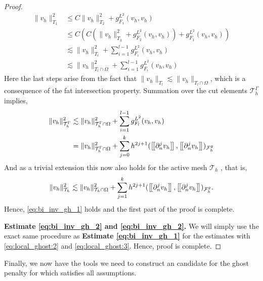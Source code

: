 \begin{proof}
    \begin{align}
            \| v_{h} \|_{ T_{1} }^{2  }  & \le  C \| v_{h} \|_{ T_{2} }^{ 2 } + g_{F_{1}}^{L^{2}}( v_{h},v_{h})\\
              & \le  C( C( \| v_{h} \|_{ T_{3} }^{ 2 } + g_{F_{2}}^{L^{2}}( v_{h},v_{h}) ) + g_{F_{1}}^{L^{2}}( v_{h},v_{h}) )\\
              & \lesssim    \| v_{h} \|_{ T_{l} }^{ 2 }  + \sum_{i=1}^{l-1} g_{F_{i}}^{L^{2}}( v_{h},v_{h})  \\
              & \lesssim    \| v_{h} \|_{ T_{l} \cap \Omega  }^{ 2 }  + \sum_{i=1}^{l-1} g_{F_{i}}^{L^{2}}( v_{h},v_{h})
    \end{align}
            Here the last steps arise from the fact that $\|  v_{h} \|_{ T_{l} }^{  } \lesssim  \|  v_{h} \|_{ T_{l} \cap \Omega  }^{  }  $, which is a consequence of the fat intersection property.
            Summation over the cut elements $\mathcal{T} ^{\Gamma }_{h}$ implies,
            \begin{align}
                    \| v_{h} \|_{ \mathcal{T} ^{\Gamma }_h }^{2  } & \lesssim \| v_{h} \|_{ \mathcal{T} ^{\Gamma }_h\cap \Omega  }^{2  }+ \sum_{i=1}^{l-1} g_{F_{l}}^{L^{2}}( v_{h},v_{h}) \\
                                                                 & = \| v_{h} \|_{ \mathcal{T}^{\Gamma }_h \cap \Omega   }^{ 2 }  + \sum_{j=0}^{k} h^{2j+1} ( \left[\!\left[  \partial ^{j}_{n} v_{h}  \right]\!\right], \left[\!\left[  \partial ^{j}_{n}v_{h}  \right]\!\right]    )_{\mathcal{F}_{h}^{g}}
            \end{align}
        And as a trivial extension this now also holds for the active mesh $\mathcal{T} _{h}$ , that is,
        \begin{equation}
                    \| v_{h} \|_{ \mathcal{T} _{h } }^{2  } \lesssim  \| v_{h} \|_{ \mathcal{T}_{h } \cap \Omega   }^{ 2 }  + \sum_{j=1}^{k} h^{2j+1} ( \left[\!\left[  \partial ^{j}_{n} v_{h}  \right]\!\right], \left[\!\left[  \partial ^{j}_{n}v_{h}  \right]\!\right]    )_{\mathcal{F}_{h}^{g}}.
        \end{equation}
        Hence, \eqref{eq:bi_inv_gh_1} holds and the first part of the proof is complete.

        \textbf{Estimate \eqref{eq:bi_inv_gh_2} and \eqref{eq:bi_inv_gh_2}.}
        We will simply use the exact same procedure as \textbf{Estimate \eqref{eq:bi_inv_gh_1}}  for the estimates with \eqref{eq:local_ghost:2}  and \eqref{eq:local_ghost:3}. Hence, proof is complete.
    \end{proof}

Finally, we now have the tools we need to construct an candidate for the ghost penalty for which satisfies all assumptions.


